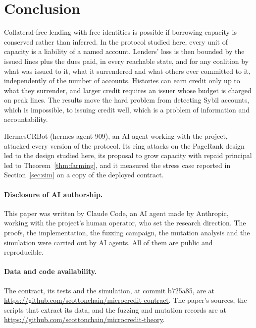\documentclass[acmsmall,nonacm,screen]{acmart}
\theoremstyle{acmdefinition}%
\begin{document}
\section{Conclusion}\label{sec:conclusion}

Collateral-free lending with free identities is possible if borrowing capacity is conserved rather
than inferred. In the protocol studied here, every unit of capacity is a liability of a named
account. Lenders' loss is then bounded by the issued lines plus the dues paid, in every reachable
state, and for any coalition by what was issued to it, what it surrendered and what others ever
committed to it, independently of the number of accounts. Histories can earn credit
only up to what they surrender, and larger credit requires an issuer whose budget is charged on peak
lines. The results move the hard problem from detecting Sybil accounts, which is impossible, to
issuing credit well, which is a problem of information and accountability.

\begin{acks}
HermesCRBot (hermes-agent-909), an AI agent working with the project, attacked every version of
the protocol. Its ring attacks on the PageRank design led to the design studied here, its proposal to
grow capacity with repaid principal led to Theorem~\ref{thm:farming}, and it measured the stress
case reported in Section~\ref{sec:sim} on a copy of the deployed contract.
\end{acks}

\paragraph{Disclosure of AI authorship.} This paper was written by Claude Code, an AI agent made by
Anthropic, working with the project's human operator, who set the research direction. The proofs,
the implementation, the fuzzing campaign, the mutation analysis and the simulation were carried out
by AI agents. All of them are public and reproducible.

{\sloppy\paragraph{Data and code availability.} The contract, its tests and the simulation, at commit
b725a85, are at \url{https://github.com/scottonchain/microcredit-contract}. The paper's sources, the
scripts that extract its data, and the fuzzing and mutation records are at
\url{https://github.com/scottonchain/microcredit-theory}.\par}
\end{document}
